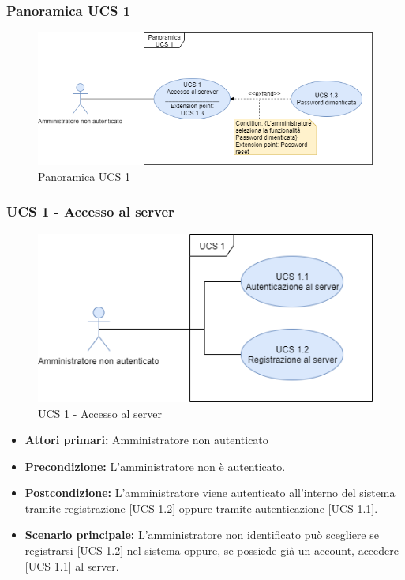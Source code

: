 \newpage
\subsubsection{Panoramica UCS 1}%

\begin{figure}[h]
  \centering
    \includegraphics[scale=0.67]{sezioni/UseCase/Immagini/PanoramicaUCS1.png}
  \caption{Panoramica UCS 1}
\end{figure}

\subsubsection{UCS 1 - Accesso al server}%

\begin{figure}[h]
  \centering
    \includegraphics[scale=0.67]{sezioni/UseCase/Immagini/UCS1.png}
  \caption{UCS 1 -  Accesso al server}
\end{figure}

\begin{itemize}
\item \textbf{Attori primari:} Amministratore non autenticato
\item \textbf{Precondizione:} L'amministratore non è autenticato.
\item \textbf{Postcondizione:} L'amministratore viene autenticato all'interno del sistema tramite registrazione [UCS 1.2] oppure tramite autenticazione [UCS 1.1].
\item \textbf{Scenario principale:} L'amministratore non identificato può scegliere se registrarsi [UCS 1.2] nel sistema oppure, se possiede già un account, accedere [UCS 1.1] al server. 
\end{itemize}

